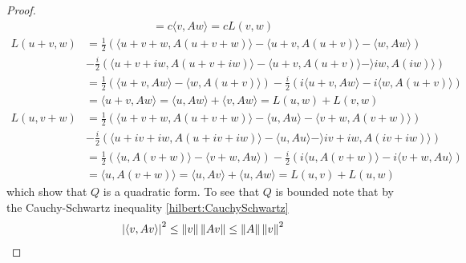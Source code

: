 \begin{proof}
\begin{align*}
&= c \langle v, Aw \rangle = c L(v,w)
\end{align*}
\begin{align*}
L(u+v, w) 
&= \frac{1}{2} \left ( \langle u+v+w, A(u+v+w) \rangle - \langle u+v, A(u+v) \rangle - \langle w, Aw\rangle \right) \\
&- \frac{i}{2} \left ( \langle u+v+iw, A(u+v + iw) \rangle - \langle u+v, A(u+v) \rangle - \rangle iw, A(iw) \rangle \right) \\
&=\frac{1}{2} \left ( \langle u+v, Aw \rangle - \langle w, A(u+v) \rangle  \right) - \frac{i}{2} \left ( i \langle u+v, Aw \rangle - i\langle w, A(u+v) \rangle \right) \\
&=\langle u+v, Aw \rangle = \langle u, Aw \rangle + \langle v, Aw \rangle = L(u,w) + L(v,w)
\end{align*}
\begin{align*}
L(u, v+w) 
&= \frac{1}{2} \left ( \langle u+v+w, A(u+v+w) \rangle - \langle u, Au \rangle - \langle v+w, A(v+w)\rangle \right) \\
&- \frac{i}{2} \left ( \langle u+iv+iw, A(u+iv + iw) \rangle - \langle u, Au \rangle - \rangle iv+iw, A(iv+iw) \rangle \right) \\
&=\frac{1}{2} \left ( \langle u, A(v+w) \rangle - \langle v+w, Au \rangle  \right) - \frac{i}{2} \left ( i \langle u, A(v+w) \rangle - i\langle v+w, Au \rangle \right) \\
&=\langle u, A(v+w) \rangle = \langle u, Av \rangle + \langle u, Aw \rangle = L(u,v) + L(u,w)
\end{align*}
which show that $Q$ is a quadratic form.  To see that $Q$ is bounded note that by the Cauchy-Schwartz inequality \ref{hilbert:CauchySchwartz}
\begin{align*}
\left \vert \langle v, Av \rangle \right \vert^2 &\leq \left \lVert v \right \rVert \left \lVert Av \right \rVert \leq \left \lVert A \right \rVert \left \lVert v \right \rVert^2
\end{align*}
\end{proof}

